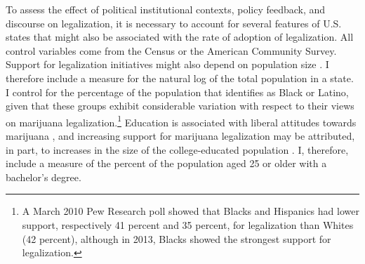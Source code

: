 To assess the effect of political institutional contexts, policy feedback, and discourse on legalization, it is necessary to account for several features of U.S. states that might also be associated with the rate of adoption of legalization. All control variables come from the Census or the American Community Survey. %
Support for legalization initiatives might also depend on population size \citep{soule_and_olzak_2004,soule_and_king_2006,boushey_2016}. I therefore include a measure for the natural log of the total population in a state. I control for the percentage of the population that identifies as Black or Latino, given that these groups exhibit considerable variation with respect to their views on marijuana legalization.\footnote{A March 2010 Pew Research poll showed that Blacks and Hispanics had lower support, respectively 41 percent and 35 percent, for legalization than Whites (42 percent), although in 2013, Blacks showed the strongest support for legalization.} Education is associated with liberal attitudes towards marijuana \citep{pedersen_2009}, and increasing support for marijuana legalization may be attributed, in part, to increases in the size of the college-educated population \citep{rosenthal_and_kubby_1996}. I, therefore, include a measure of the percent of the population aged 25 or older with a bachelor's degree. %

